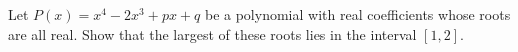 Let $P(x)=x^4-2x^3+px+q$ be a polynomial with real coefficients whose roots are all real.
Show that the largest of these roots lies in the interval $[1,2]$.